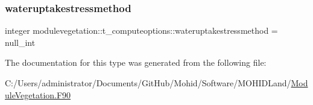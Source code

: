 \subsubsection{\texorpdfstring{wateruptakestressmethod}{wateruptakestressmethod}}
{\footnotesize\ttfamily integer modulevegetation\+::t\+\_\+computeoptions\+::wateruptakestressmethod = null\+\_\+int\hspace{0.3cm}{\ttfamily [private]}}



The documentation for this type was generated from the following file\+:\begin{DoxyCompactItemize}
\item 
C\+:/\+Users/administrator/\+Documents/\+Git\+Hub/\+Mohid/\+Software/\+M\+O\+H\+I\+D\+Land/\mbox{\hyperlink{_module_vegetation_8_f90}{Module\+Vegetation.\+F90}}\end{DoxyCompactItemize}
